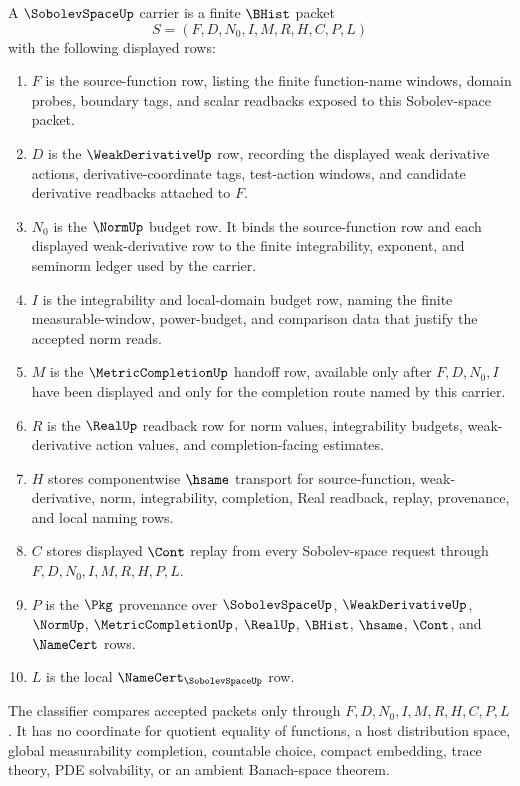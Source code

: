 \begin{definition}
\label{def:sobolev-space-carrier}
A $\SobolevSpaceUp$ carrier is a finite $\BHist$ packet
$$
S=(F,D,N_0,I,M,R,H,C,P,L)
$$
with the following displayed rows:
\begin{enumerate}
\item $F$ is the source-function row, listing the finite function-name windows, domain probes, boundary tags, and scalar readbacks exposed to this Sobolev-space packet.
\item $D$ is the $\WeakDerivativeUp$ row, recording the displayed weak derivative actions, derivative-coordinate tags, test-action windows, and candidate derivative readbacks attached to $F$.
\item $N_0$ is the $\NormUp$ budget row. It binds the source-function row and each displayed weak-derivative row to the finite integrability, exponent, and seminorm ledger used by the carrier.
\item $I$ is the integrability and local-domain budget row, naming the finite measurable-window, power-budget, and comparison data that justify the accepted norm reads.
\item $M$ is the $\MetricCompletionUp$ handoff row, available only after $F,D,N_0,I$ have been displayed and only for the completion route named by this carrier.
\item $R$ is the $\RealUp$ readback row for norm values, integrability budgets, weak-derivative action values, and completion-facing estimates.
\item $H$ stores componentwise $\hsame$ transport for source-function, weak-derivative, norm, integrability, completion, Real readback, replay, provenance, and local naming rows.
\item $C$ stores displayed $\Cont$ replay from every Sobolev-space request through $F,D,N_0,I,M,R,H,P,L$.
\item $P$ is the $\Pkg$ provenance over $\SobolevSpaceUp$, $\WeakDerivativeUp$, $\NormUp$, $\MetricCompletionUp$, $\RealUp$, $\BHist$, $\hsame$, $\Cont$, and $\NameCert$ rows.
\item $L$ is the local $\NameCert_{\SobolevSpaceUp}$ row.
\end{enumerate}
The classifier compares accepted packets only through $F,D,N_0,I,M,R,H,C,P,L$. It has no coordinate for quotient equality of functions, a host distribution space, global measurability completion, countable choice, compact embedding, trace theory, PDE solvability, or an ambient Banach-space theorem.
\end{definition}

